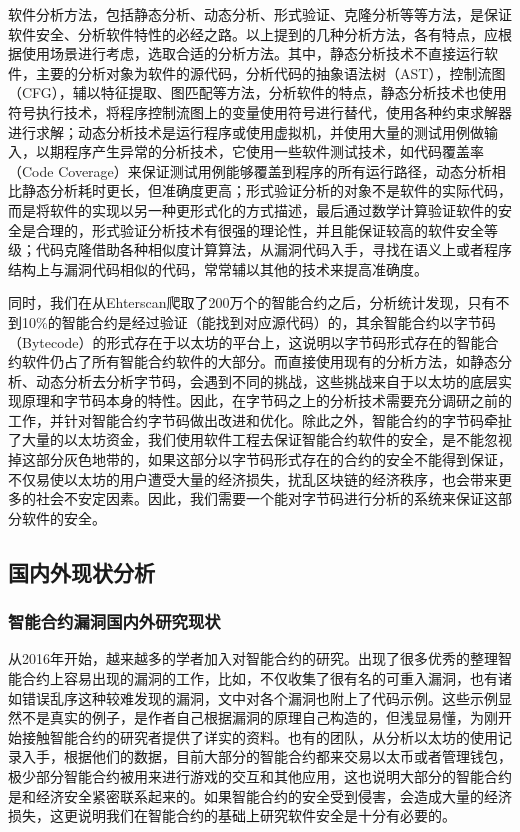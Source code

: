 软件分析方法，包括静态分析、动态分析、形式验证、克隆分析等等方法，是保证软件安全、分析软件特性的必经之路。以上提到的几种分析方法，各有特点，应根据使用场景进行考虑，选取合适的分析方法。其中，静态分析技术不直接运行软件，主要的分析对象为软件的源代码，分析代码的抽象语法树（AST），控制流图（CFG），辅以特征提取\cite{deckard}、图匹配等方法，分析软件的特点，静态分析技术也使用符号执行技术，将程序控制流图上的变量使用符号进行替代，使用各种约束求解器进行求解；动态分析技术是运行程序或使用虚拟机，并使用大量的测试用例做输入，以期程序产生异常的分析技术，它使用一些软件测试技术，如代码覆盖率（Code Coverage）来保证测试用例能够覆盖到程序的所有运行路径，动态分析相比静态分析耗时更长，但准确度更高；形式验证分析的对象不是软件的实际代码，而是将软件的实现以另一种更形式化的方式描述，最后通过数学计算验证软件的安全是合理的，形式验证分析技术有很强的理论性，并且能保证较高的软件安全等级；代码克隆借助各种相似度计算算法，从漏洞代码入手，寻找在语义上或者程序结构上与漏洞代码相似的代码，常常辅以其他的技术来提高准确度。

同时，我们在从Ehterscan爬取了200万个的智能合约之后，分析统计发现，只有不到10\%的智能合约是经过验证（能找到对应源代码）的，其余智能合约以字节码（Bytecode）的形式存在于以太坊的平台上，这说明以字节码形式存在的智能合约软件仍占了所有智能合约软件的大部分。而直接使用现有的分析方法，如静态分析、动态分析去分析字节码，会遇到不同的挑战，这些挑战来自于以太坊的底层实现原理和字节码本身的特性。因此，在字节码之上的分析技术需要充分调研之前的工作，并针对智能合约字节码做出改进和优化。除此之外，智能合约的字节码牵扯了大量的以太坊资金，我们使用软件工程去保证智能合约软件的安全，是不能忽视掉这部分灰色地带的，如果这部分以字节码形式存在的合约的安全不能得到保证，不仅易使以太坊的用户遭受大量的经济损失，扰乱区块链的经济秩序，也会带来更多的社会不安定因素。因此，我们需要一个能对字节码进行分析的系统来保证这部分软件的安全。

\subsection{国内外现状分析}

\subsubsection{智能合约漏洞国内外研究现状}

从2016年开始，越来越多的学者加入对智能合约的研究。出现了很多优秀的整理智能合约上容易出现的漏洞的工作，比如\cite{survey-on-attacks}，不仅收集了很有名的可重入漏洞，也有诸如错误乱序这种较难发现的漏洞，文中对各个漏洞也附上了代码示例。这些示例显然不是真实的例子，是作者自己根据漏洞的原理自己构造的，但浅显易懂，为刚开始接触智能合约的研究者提供了详实的资料。也有的团队\cite{survey-on-smart-contracts}，从分析以太坊的使用记录入手，根据他们的数据，目前大部分的智能合约都来交易以太币或者管理钱包，极少部分智能合约被用来进行游戏的交互和其他应用，这也说明大部分的智能合约是和经济安全紧密联系起来的。如果智能合约的安全受到侵害，会造成大量的经济损失，这更说明我们在智能合约的基础上研究软件安全是十分有必要的。

